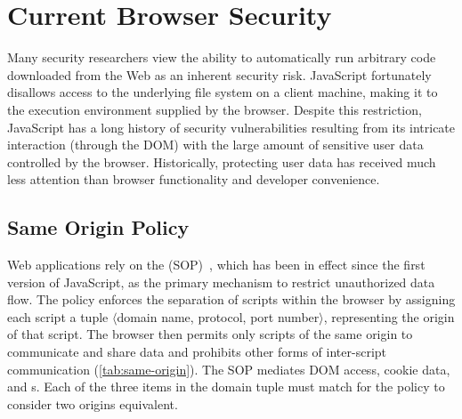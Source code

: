 \section{Current Browser Security}\label{sec:current-security-models}

Many security researchers view the ability to automatically run arbitrary code downloaded from the Web as an inherent security risk.
JavaScript fortunately disallows access to the underlying file system on a client machine, making it  to the execution environment supplied by the browser.
Despite this restriction, JavaScript has a long history of security vulnerabilities resulting from its intricate interaction (through the DOM) with the large amount of sensitive user data controlled by the browser.
Historically, protecting user data has received much less attention than browser functionality and developer convenience.

\subsection{Same Origin Policy}\label{sec:same-origin}

Web applications rely on the  (SOP)~\cite{sop}, which has been in effect since the first version of JavaScript, as the primary mechanism to restrict unauthorized data flow.
The policy enforces the separation of scripts within the browser by assigning each script a tuple $\langle$domain name, protocol, port number$\rangle$, representing the origin of that script.
The browser then permits only scripts of the same origin to communicate and share data and prohibits other forms of inter-script communication (\autoref{tab:same-origin}).
The SOP mediates DOM access, cookie data, and s.
Each of the three items in the domain tuple must match for the policy to consider two origins equivalent.

